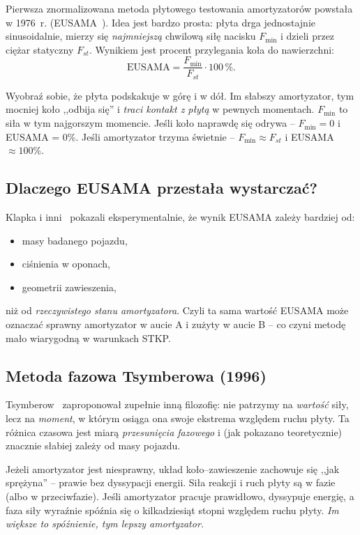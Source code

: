 \documentclass[11pt,a4paper]{article}
\theoremstyle{plainpol}
\begin{document}
Pierwsza znormalizowana metoda płytowego testowania amortyzatorów
powstała w 1976~r. (EUSAMA~\cite{EUSAMA1976}). Idea jest bardzo prosta:
płyta drga jednostajnie sinusoidalnie, mierzy się \emph{najmniejszą}
chwilową siłę nacisku $F_{\min}$ i dzieli przez ciężar statyczny $F_{st}$.
Wynikiem jest procent przylegania koła do nawierzchni:
\begin{equation}
  \mathrm{EUSAMA} = \dfrac{F_{\min}}{F_{st}}\cdot 100\,\%.
  \label{eq:eusama}
\end{equation}

\begin{intuicja}
Wyobraź sobie, że płyta podskakuje w górę i w dół. Im słabszy amortyzator,
tym mocniej koło ,,odbija się'' i \emph{traci kontakt z płytą} w pewnych
momentach. $F_{\min}$ to siła w tym najgorszym momencie. Jeśli koło
naprawdę się odrywa -- $F_{\min} = 0$ i EUSAMA = 0\%. Jeśli amortyzator
trzyma świetnie -- $F_{\min}\approx F_{st}$ i EUSAMA $\approx 100\%$.
\end{intuicja}

\subsection{Dlaczego EUSAMA przestała wystarczać?}

Klapka i inni~\cite{Klapka2017} pokazali eksperymentalnie, że wynik
EUSAMA zależy bardziej od:
\begin{itemize}
  \item masy badanego pojazdu,
  \item ciśnienia w oponach,
  \item geometrii zawieszenia,
\end{itemize}
niż od \emph{rzeczywistego stanu amortyzatora}. Czyli ta sama wartość
EUSAMA może oznaczać sprawny amortyzator w aucie A i zużyty w aucie B
-- co czyni metodę mało wiarygodną w warunkach STKP.

\subsection{Metoda fazowa Tsymberowa (1996)}

Tsymberow~\cite{Tsymberov1996} zaproponował zupełnie inną filozofię:
nie patrzymy na \emph{wartość} siły, lecz na \emph{moment}, w którym
osiąga ona swoje ekstrema względem ruchu płyty. Ta różnica czasowa
jest miarą \emph{przesunięcia fazowego} i (jak pokazano teoretycznie)
znacznie słabiej zależy od masy pojazdu.

\begin{intuicja}
Jeżeli amortyzator jest niesprawny, układ koło--zawieszenie zachowuje się
,,jak sprężyna'' -- prawie bez dyssypacji energii. Siła reakcji i ruch
płyty są w fazie (albo w przeciwfazie). Jeśli amortyzator pracuje
prawidłowo, dyssypuje energię, a faza siły wyraźnie spóźnia się
o kilkadziesiąt stopni względem ruchu płyty. \emph{Im większe to
spóźnienie, tym lepszy amortyzator.}
\end{intuicja}
\end{document}
